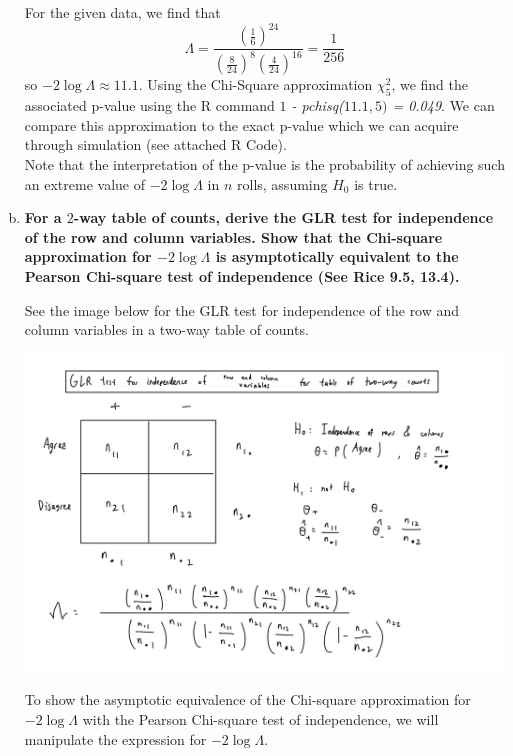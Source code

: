 \begin{enumerate}[a)]
    For the given data, we find that 
    \[
        \Lambda = \frac{\left( \frac{1}{6} \right)^{24} }{\left(\frac{8}{24}\right)^8 \left(\frac{4}{24}\right)^{16}} = \frac{1}{256}
    \]
    so $-2 \log \Lambda \approx 11.1$. Using the Chi-Square approximation $\chi^2_5$, we find the associated p-value using the R command \textit{$1$ - pchisq($11.1, 5)$ = 0.049}.
    We can compare this approximation to the exact p-value which we can acquire through simulation (see attached R Code). \\

    Note that the interpretation of the p-value is the probability of achieving such an extreme value of $-2\log \Lambda$ in $n$ rolls, assuming $H_0$ is true. 

    \item \textbf{For a $2$-way table of counts, derive the GLR test for independence of the row and column variables. Show that the Chi-square approximation for $-2 \log \Lambda$ is asymptotically equivalent to the Pearson Chi-square test of independence (See Rice 9.5, 13.4).}
    
     See the image below for the GLR test for independence of the row and column variables in a two-way table of counts.\\
    
    \begin{center}
    \includegraphics[scale=0.25]{week6_c.jpeg}
    \end{center}

    To show the asymptotic equivalence of the Chi-square approximation for $-2 \log \Lambda$ with the Pearson Chi-square test of independence, we will manipulate the expression for $-2 \log \Lambda$. \\
    

\end{enumerate}
